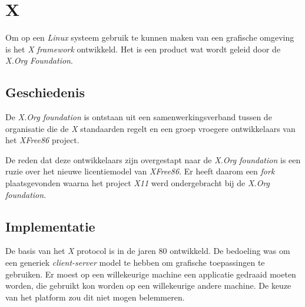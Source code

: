%
%
%
%

\chapter{X}
Om op een \emph{Linux} systeem gebruik te kunnen maken van een grafische omgeving is het \emph{X framework} ontwikkeld. Het is een product wat wordt geleid door de \emph{X.Org Foundation}. 

\section{Geschiedenis}
De \emph{X.Org foundation} is ontstaan uit een samenwerkingsverband tussen de organisatie die de \emph{X} standaarden regelt en een groep vroegere ontwikkelaars van het \emph{XFree86} project. 

De reden dat deze ontwikkelaars zijn overgestapt naar de \emph{X.Org foundation} is een ruzie over het nieuwe licentiemodel van \emph{XFree86}. Er heeft daarom een \emph{fork} plaatsgevonden waarna het project \emph{X11} werd ondergebracht bij de \emph{X.Org foundation}. 

\section{Implementatie}
De basis van het \emph{X} protocol is in de jaren 80 ontwikkeld. De bedoeling was om een generiek \emph{client-server} model te hebben om grafische toepassingen te gebruiken. Er moest op een willekeurige machine een applicatie gedraaid moeten worden, die gebruikt kon worden op een willekeurige andere machine. De keuze van het platform zou dit niet mogen belemmeren. 

